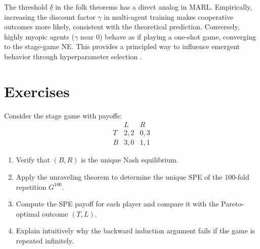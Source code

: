 \documentclass[11pt,a4paper]{article}
\begin{document}
\begin{rlconnection}[title={The Discount Factor and Cooperation}]
The threshold $\underline{\delta}$ in the folk theorems has a direct analog
in MARL. Empirically, increasing the discount factor $\gamma$ in multi-agent
training makes cooperative outcomes more likely, consistent with the
theoretical prediction. Conversely, highly myopic agents ($\gamma$ near $0$)
behave as if playing a one-shot game, converging to the stage-game NE. This
provides a principled way to influence emergent behavior through
hyperparameter selection \citep{shoham2008}.
\end{rlconnection}


\section{Exercises}
\label{sec:exercises}

\begin{exercise}
\label{ex:unraveling}
Consider the stage game with payoffs:
\[
\begin{array}{c|cc}
  & L & R \\ \hline
T & 2,2 & 0,3 \\
B & 3,0 & 1,1
\end{array}
\]
\begin{enumerate}[label=(\alph*)]
    \item Verify that $(B,R)$ is the unique Nash equilibrium.
    \item Apply the unraveling theorem to determine the unique SPE of the
    $100$-fold repetition $G^{100}$.
    \item Compute the SPE payoff for each player and compare it with the
    Pareto-optimal outcome $(T,L)$.
    \item Explain intuitively why the backward induction argument fails if
    the game is repeated infinitely.
\end{enumerate}
\end{exercise}
\end{document}
